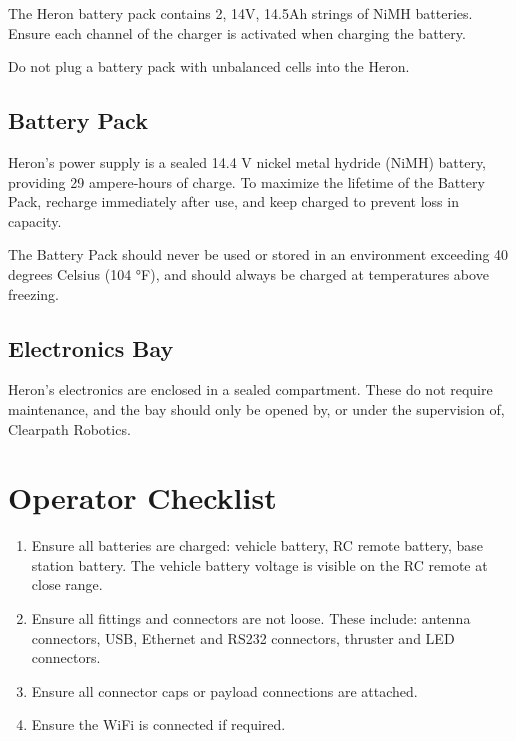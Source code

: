 \documentclass[]{clearpath-latex/clearpath-manual}
\begin{document}
\begin{warning}
The Heron battery pack contains 2, 14V, 14.5Ah strings of NiMH batteries. Ensure each channel of the charger is activated when charging the battery. 
\end{warning}	

\begin{warning}
Do not plug a battery pack with unbalanced cells into the Heron. 
\end{warning}	

\subsection{Battery Pack}
Heron's power supply is a sealed 14.4 V nickel metal hydride (NiMH) battery, providing 29 ampere-hours of charge. To maximize the lifetime of the Battery Pack, recharge immediately after use, and keep charged to prevent loss in capacity.

The Battery Pack should never be used or stored in an environment exceeding 40 degrees Celsius (104 °F), and should always be charged at temperatures above freezing.

\subsection{Electronics Bay}
Heron's electronics are enclosed in a sealed compartment. These do not require maintenance, and the bay should only be opened by, or under the supervision of, Clearpath Robotics.

\newpage

\section{Operator Checklist}

\begin{enumerate}
\item Ensure all batteries are charged: vehicle battery, RC remote battery, base station battery. The vehicle battery voltage is visible on the RC remote at close range.
\item Ensure all fittings and connectors are not loose. These include: antenna connectors, USB, Ethernet and RS232 connectors, thruster and LED connectors.
\item Ensure all connector caps or payload connections are attached.
\item Ensure the WiFi is connected if required.
\end{enumerate}
\end{document}
